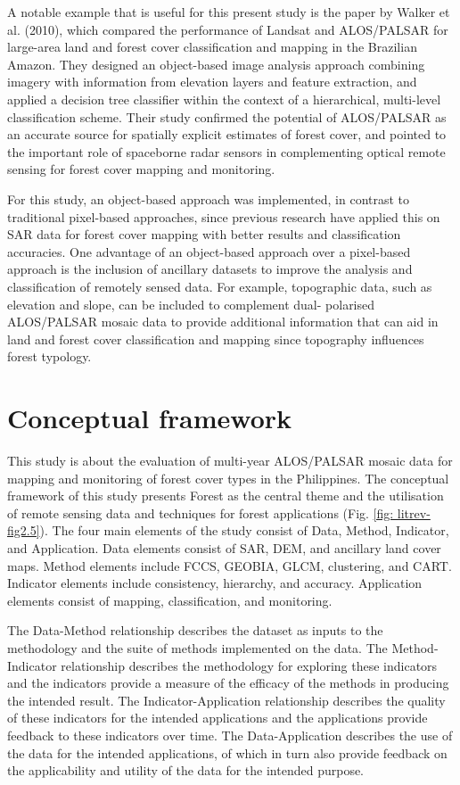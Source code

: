 A notable example that is useful for this present study is the paper by Walker et al. (2010), which compared the performance of Landsat and ALOS/PALSAR for large-area land and forest cover classification and mapping in the Brazilian Amazon. They designed an object-based image analysis approach combining imagery with information from elevation layers and feature extraction, and applied a decision tree classifier within the context of a hierarchical, multi-level classification scheme. Their study confirmed the potential of ALOS/PALSAR as an accurate source for spatially explicit estimates of forest cover, and pointed to the important role of spaceborne radar sensors in complementing optical remote sensing for forest cover mapping and monitoring.

For this study, an object-based approach was implemented, in contrast to traditional pixel-based approaches, since previous research have applied this on SAR data for forest cover mapping with better results and classification accuracies. One advantage of an object-based approach over a pixel-based approach is the inclusion of ancillary datasets to improve the analysis and classification of remotely sensed data. For example, topographic data, such as elevation and slope, can be included to complement dual- polarised ALOS/PALSAR mosaic data to provide additional information that can aid in land and forest cover classification and mapping since topography influences forest typology.

\section{Conceptual framework}
\label{sec: litrev-conceptual-framework}

This study is about the evaluation of multi-year ALOS/PALSAR mosaic data for mapping and monitoring of forest cover types in the Philippines. The conceptual framework of this study presents Forest as the central theme and the utilisation of remote sensing data and techniques for forest applications (Fig. \ref{fig: litrev-fig2.5}). The four main elements of the study consist of Data, Method, Indicator, and Application. Data elements consist of SAR, DEM, and ancillary land cover maps. Method elements include FCCS, GEOBIA, GLCM, clustering, and CART. Indicator elements include consistency, hierarchy, and accuracy. Application elements consist of mapping, classification, and monitoring.

The Data-Method relationship describes the dataset as inputs to the methodology and the suite of methods implemented on the data. The Method-Indicator relationship describes the methodology for exploring these indicators and the indicators provide a measure of the efficacy of the methods in producing the intended result. The Indicator-Application relationship describes the quality of these indicators for the intended applications and the applications provide feedback to these indicators over time. The Data-Application describes the use of the data for the intended applications, of which in turn also provide feedback on the applicability and utility of the data for the intended purpose.

